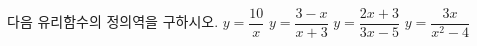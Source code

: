 다음 유리함수의 정의역을 구하시오.
 $y=\dfrac{10}{x}$
 $y=\dfrac{3-x}{x+3}$
 $y=\dfrac{2x+3}{3x-5}$
 $y=\dfrac{3x}{x^2-4}$
